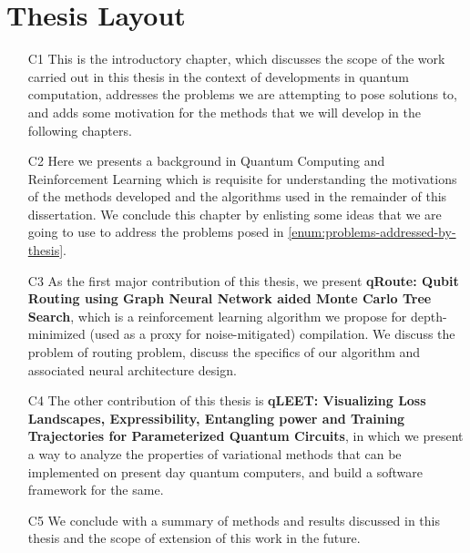 \section{Thesis Layout}

\begin{itemize}
    \item[C1] This is the introductory chapter, which discusses the scope of the work carried out in this thesis in the context of developments in quantum computation, addresses the problems we are attempting to pose solutions to, and adds some motivation for the methods that we will develop in the following chapters.
    \item[C2] Here we presents a background in Quantum Computing and Reinforcement Learning which is requisite for understanding the motivations of the methods developed and the algorithms used in the remainder of this dissertation. We conclude this chapter by enlisting some ideas that we are going to use to address the problems posed in \ref{enum:problems-addressed-by-thesis}.
    \item[C3] As the first major contribution of this thesis, we present \textbf{qRoute: Qubit Routing using Graph Neural Network aided Monte Carlo Tree Search}, which is a reinforcement learning algorithm we propose for depth-minimized (used as a proxy for noise-mitigated) compilation. We discuss the problem of routing problem, discuss the specifics of our algorithm and associated neural architecture design.
    \item[C4] The other contribution of this thesis is \textbf{qLEET: Visualizing Loss Landscapes, Expressibility, Entangling power and Training Trajectories for Parameterized Quantum Circuits}, in which we present a way to analyze the properties of variational methods that can be implemented on present day quantum computers, and build a software framework for the same.
    \item[C5] We conclude with a summary of methods and results discussed in this thesis and the scope of extension of this work in the future.
\end{itemize}

